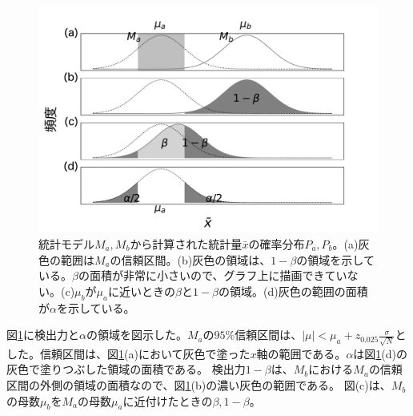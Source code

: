 \begin{figure}
\begin{center}
 \includegraphics[width=15cm]{./image/04_/power_of_a_test_2.pdf}
 \caption{統計モデル$M_a,M_b$から計算された統計量$\bar{x}$の確率分布$P_a,P_b$。(a)灰色の範囲は$M_a$の信頼区間。(b)灰色の領域は、$1-\beta$の領域を示している。$\beta$の面積が非常に小さいので、グラフ上に描画できていない。(c)$\mu_b$が$\mu_a$に近いときの$\beta$と$1-\beta$の領域。(d)灰色の範囲の面積が$\alpha$を示している。}
 \label{fig:power_of_test_alpha_beta}
\end{center}
\end{figure}


図\ref{fig:power_of_test_alpha_beta}に検出力と$\alpha$の領域を図示した。$M_a$の$95\%$信頼区間は、$|\mu|<\mu_a+z_{0.025}\frac{\sigma}{\sqrt{N}}$とした。信頼区間は、図\ref{fig:power_of_test_alpha_beta}(a)において灰色で塗った$x$軸の範囲である。$\alpha$は図\ref{fig:power_of_test_alpha_beta}(d)の灰色で塗りつぶした領域の面積である。
検出力$1-\beta$は、$M_b$における$M_a$の信頼区間の外側の領域の面積なので、図\ref{fig:power_of_test_alpha_beta}(b)の濃い灰色の範囲である。
図\label{fig:power_of_test_alpha_beta}(c)は、$M_b$の母数$\mu_b$を$M_a$の母数$\mu_a$に近付けたときの$\beta,1-\beta$。



